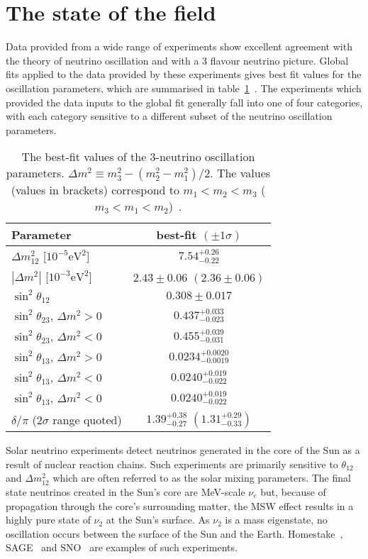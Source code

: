 \section{The state of the field}
\label{sec:StateOfTheField}
Data provided from a wide range of experiments show excellent agreement with the theory of neutrino oscillation and with a 3 flavour neutrino picture.  Global fits applied to the data provided by these experiments gives best fit values for the oscillation parameters, which are summarised in table~\ref{table:NeutrinoOscillationParameterValues}~\cite{Agashe:2014kda}.  The experiments which provided the data inputs to the global fit generally fall into one of four categories, with each category sensitive to a different subset of the neutrino oscillation parameters.
\begin{table}
  \begin{tabular}{l c }
    Parameter & best-fit $(\pm1\sigma)$ \\ \hline \hline
    $\Delta m^2_{12}$ [$10^{-5}\textrm{eV}^2$] & $7.54^{+0.26}_{-0.22}$ \\
    $|\Delta m^2|$ [$10^{-3}\textrm{eV}^2$] & $2.43\pm0.06$ $(2.36\pm0.06)$ \\
    $\sin^2\theta_{12}$ & $0.308\pm0.017$ \\
    $\sin^2\theta_{23}$, $\Delta m^2 > 0$ & $0.437^{+0.033}_{-0.023}$ \\
    $\sin^2\theta_{23}$, $\Delta m^2 < 0$ & $0.455^{+0.039}_{-0.031}$ \\
    $\sin^2\theta_{13}$, $\Delta m^2 > 0$ & $0.0234^{+0.0020}_{-0.0019}$ \\
    $\sin^2\theta_{13}$, $\Delta m^2 < 0$ & $0.0240^{+0.019}_{-0.022}$ \\
    $\sin^2\theta_{13}$, $\Delta m^2 < 0$ & $0.0240^{+0.019}_{-0.022}$ \\
    $\delta/\pi$ ($2\sigma$ range quoted) & $1.39^{+0.38}_{-0.27}$ $(1.31^{+0.29}_{-0.33})$ \\
  \end{tabular}
  \caption{The best-fit values of the 3-neutrino oscillation parameters. $\Delta m^2 \equiv m^2_3 - \left(m^2_2 - m^2_1\right)/2$. The values (values in brackets) correspond to $m_1 < m_2 < m_3$ ($m_3 < m_1 < m_2$)~\cite{Agashe:2014kda}.}
  \label{table:NeutrinoOscillationParameterValues}
\end{table}
\newline
\newline
Solar neutrino experiments detect neutrinos generated in the core of the Sun as a result of nuclear reaction chains.  Such experiments are primarily sensitive to $\theta_{12}$ and $\Delta m^{2}_{12}$ which are often referred to as the solar mixing parameters.  The final state neutrinos created in the Sun's core are MeV-scale $\nu_e$ but, because of propagation through the core's surrounding matter, the MSW effect results in a highly pure state of $\nu_2$ at the Sun's surface.  As $\nu_2$ is a mass eigenstate, no oscillation occurs between the surface of the Sun and the Earth.  Homestake~\cite{0004-637X-496-1-505}, SAGE~\cite{PhysRevC.80.015807} and SNO~\cite{PhysRevLett.87.071301} are examples of such experiments.
